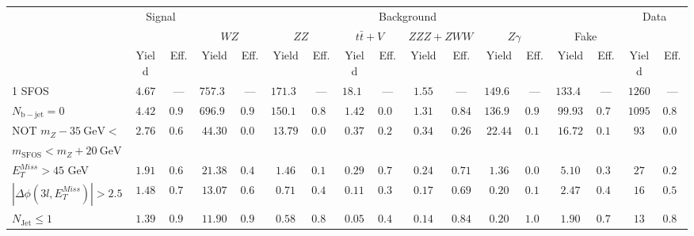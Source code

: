 \begin{tabular}{l||c|c||c|c||c|c||c|c||c|c||c|c||c|c||c|c}
\hline
 &                 \multicolumn{2}{c||}{Signal}            &  \multicolumn{12}{c||}{Background} &  \multicolumn{2}{c}{Data} \\
 & &  & \multicolumn{2}{c||}{$WZ$} & \multicolumn{2}{c||}{$ZZ$} & \multicolumn{2}{c||}{$t\bar{t}+V$} & \multicolumn{2}{c||}{$ZZZ+ZWW$} & \multicolumn{2}{c||}{$Z\gamma$} & \multicolumn{2}{c||}{Fake} &  & \\ 
 & Yield & Eff. & Yield & Eff. & Yield & Eff. & Yield & Eff. & Yield & Eff. & Yield & Eff. & Yield & Eff. & Yield & Eff.\\
\hline\hline
1 SFOS &  $4.67$ &  --- &  $757.38$ &  --- &  $171.39$ &  --- &  $18.10$ &  --- &  $1.55$ &  --- &  $149.60$ &  --- &  $133.47$ &  --- & $1260$ &  ---\\ 
\hline
$N_{\mathrm{b-jet}} = 0$ &  $4.42$ &  $0.94$ &  $696.90$ &  $0.92$ &  $150.14$ &  $0.88$ &  $1.42$ &  $0.08$ &  $1.31$ &  $0.84$ &  $136.96$ &  $0.92$ &  $99.93$ &  $0.75$ & $1095$ &  $0.87$\\ 
\hline
NOT $m_Z - 35~\mathrm{GeV} <$  &  \multirow{2}{*}{$2.76$} &  \multirow{2}{*}{$0.63$} &  \multirow{2}{*}{$44.30$} &  \multirow{2}{*}{$0.06$} &  \multirow{2}{*}{$13.79$} &  \multirow{2}{*}{$0.09$} &  \multirow{2}{*}{$0.37$} &  \multirow{2}{*}{$0.26$} &  \multirow{2}{*}{$0.34$} &  \multirow{2}{*}{$0.26$} &  \multirow{2}{*}{$22.44$} &  \multirow{2}{*}{$0.16$} &  \multirow{2}{*}{$16.72$} &  \multirow{2}{*}{$0.17$} & \multirow{2}{*}{$93$} &  \multirow{2}{*}{$0.08$}\\ 
$ m_{\mathrm{SFOS}} < m_Z + 20~\mathrm{GeV}$  & & & & & & & & & & & & & &  & \\
\hline
$E_{T}^{Miss} > 45$ GeV &  $1.91$ &  $0.69$ &  $21.38$ &  $0.48$ &  $1.46$ &  $0.11$ &  $0.29$ &  $0.78$ &  $0.24$ &  $0.71$ &  $1.36$ &  $0.06$ &  $5.10$ &  $0.31$ & $27$ &  $0.29$\\ 
\hline
$|\Delta\phi(3l,E_{T}^{Miss})| > 2.5$ &  $1.48$ &  $0.77$ &  $13.07$ &  $0.61$ &  $0.71$ &  $0.49$ &  $0.11$ &  $0.39$ &  $0.17$ &  $0.69$ &  $0.20$ &  $0.15$ &  $2.47$ &  $0.48$ & $16$ &  $0.59$\\ 
\hline
$N_{\mathrm{Jet}} \leq 1$ &  $1.39$ &  $0.94$ &  $11.90$ &  $0.91$ &  $0.58$ &  $0.82$ &  $0.05$ &  $0.45$ &  $0.14$ &  $0.84$ &  $0.20$ &  $1.00$ &  $1.90$ &  $0.77$ & $13$ &  $0.81$\\ 
\hline
\end{tabular}
